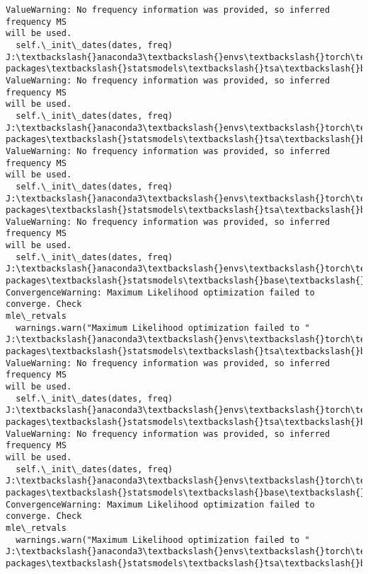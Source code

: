 \documentclass[11pt]{article}
\begin{document}
\begin{Verbatim}[commandchars=\\\{\}]
ValueWarning: No frequency information was provided, so inferred frequency MS
will be used.
  self.\_init\_dates(dates, freq)
J:\textbackslash{}anaconda3\textbackslash{}envs\textbackslash{}torch\textbackslash{}Lib\textbackslash{}site-packages\textbackslash{}statsmodels\textbackslash{}tsa\textbackslash{}base\textbackslash{}tsa\_model.py:473:
ValueWarning: No frequency information was provided, so inferred frequency MS
will be used.
  self.\_init\_dates(dates, freq)
J:\textbackslash{}anaconda3\textbackslash{}envs\textbackslash{}torch\textbackslash{}Lib\textbackslash{}site-packages\textbackslash{}statsmodels\textbackslash{}tsa\textbackslash{}base\textbackslash{}tsa\_model.py:473:
ValueWarning: No frequency information was provided, so inferred frequency MS
will be used.
  self.\_init\_dates(dates, freq)
J:\textbackslash{}anaconda3\textbackslash{}envs\textbackslash{}torch\textbackslash{}Lib\textbackslash{}site-packages\textbackslash{}statsmodels\textbackslash{}tsa\textbackslash{}base\textbackslash{}tsa\_model.py:473:
ValueWarning: No frequency information was provided, so inferred frequency MS
will be used.
  self.\_init\_dates(dates, freq)
J:\textbackslash{}anaconda3\textbackslash{}envs\textbackslash{}torch\textbackslash{}Lib\textbackslash{}site-packages\textbackslash{}statsmodels\textbackslash{}base\textbackslash{}model.py:607:
ConvergenceWarning: Maximum Likelihood optimization failed to converge. Check
mle\_retvals
  warnings.warn("Maximum Likelihood optimization failed to "
J:\textbackslash{}anaconda3\textbackslash{}envs\textbackslash{}torch\textbackslash{}Lib\textbackslash{}site-packages\textbackslash{}statsmodels\textbackslash{}tsa\textbackslash{}base\textbackslash{}tsa\_model.py:473:
ValueWarning: No frequency information was provided, so inferred frequency MS
will be used.
  self.\_init\_dates(dates, freq)
J:\textbackslash{}anaconda3\textbackslash{}envs\textbackslash{}torch\textbackslash{}Lib\textbackslash{}site-packages\textbackslash{}statsmodels\textbackslash{}tsa\textbackslash{}base\textbackslash{}tsa\_model.py:473:
ValueWarning: No frequency information was provided, so inferred frequency MS
will be used.
  self.\_init\_dates(dates, freq)
J:\textbackslash{}anaconda3\textbackslash{}envs\textbackslash{}torch\textbackslash{}Lib\textbackslash{}site-packages\textbackslash{}statsmodels\textbackslash{}base\textbackslash{}model.py:607:
ConvergenceWarning: Maximum Likelihood optimization failed to converge. Check
mle\_retvals
  warnings.warn("Maximum Likelihood optimization failed to "
J:\textbackslash{}anaconda3\textbackslash{}envs\textbackslash{}torch\textbackslash{}Lib\textbackslash{}site-packages\textbackslash{}statsmodels\textbackslash{}tsa\textbackslash{}base\textbackslash{}tsa\_model.py:473:

\end{Verbatim}
\end{document}

